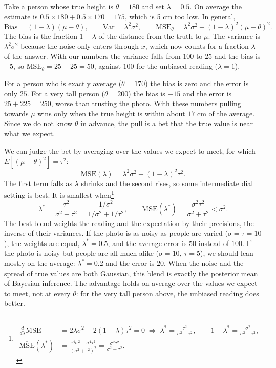 \documentclass{article}
\begin{document}
Take a person whose true height is $\theta = 180$ and set $\lambda = 0.5$. On average the estimate is $0.5\times 180 + 0.5\times 170 = 175$, which is 5 cm too low. In general,
\begin{equation*}
	\mathrm{Bias} = (1-\lambda)(\mu-\theta), \qquad
	\mathrm{Var} = \lambda^2\sigma^2, \qquad
	\mathrm{MSE}_\theta = \lambda^2\sigma^2 + (1-\lambda)^2(\mu-\theta)^2 .
\end{equation*}
The bias is the fraction $1-\lambda$ of the distance from the truth to $\mu$. The variance is $\lambda^2\sigma^2$ because the noise only enters through $x$, which now counts for a fraction $\lambda$ of the answer. With our numbers the variance falls from $100$ to $25$ and the bias is $-5$, so
$\mathrm{MSE}_\theta = 25 + 25 = 50$, against $100$ for the unbiased reading ($\lambda = 1$).

For a person who is exactly average ($\theta = 170$) the bias is zero and the error is only $25$. For a very tall person ($\theta = 200$) the bias is $-15$ and the error is $25 + 225 = 250$, worse than trusting the photo. With these numbers pulling towards $\mu$ wins only when the true height is within about $17$ cm of the average. Since we do not know $\theta$ in advance, the pull is a bet that the true value is near what we expect.

We can judge the bet by averaging over the values we expect to meet, for which $E[(\mu-\theta)^2]=\tau^2$:
\begin{equation*}
	\overline{\mathrm{MSE}}(\lambda) = \lambda^2\sigma^2 + (1-\lambda)^2\tau^2 .
\end{equation*}
The first term falls as $\lambda$ shrinks and the second rises, so some intermediate dial setting is best. It is smallest when\footnote{
	\begin{align*}
		\frac{d}{d\lambda}\overline{\mathrm{MSE}}
		&= 2\lambda\sigma^2 - 2(1-\lambda)\tau^2 = 0
		\;\Rightarrow\; \lambda^\ast = \frac{\tau^2}{\sigma^2+\tau^2},
		\qquad 1-\lambda^\ast = \frac{\sigma^2}{\sigma^2+\tau^2},\\[4pt]
		\overline{\mathrm{MSE}}(\lambda^\ast)
		&= \frac{\tau^4\sigma^2 + \sigma^4\tau^2}{(\sigma^2+\tau^2)^2}
		= \frac{\sigma^2\tau^2}{\sigma^2+\tau^2}.
	\end{align*}
}
\begin{equation*}
	\lambda^\ast = \frac{\tau^2}{\sigma^2+\tau^2} = \frac{1/\sigma^2}{1/\sigma^2 + 1/\tau^2},
	\qquad
	\overline{\mathrm{MSE}}(\lambda^\ast) = \frac{\sigma^2\tau^2}{\sigma^2+\tau^2} < \sigma^2 .
\end{equation*}
The best blend weights the reading and the expectation by their precisions, the inverse of their variances. If the photo is as noisy as people are varied ($\sigma = \tau = 10$), the weights are equal, $\lambda^\ast = 0.5$, and the average error is $50$ instead of $100$. If the photo is noisy but people are all much alike ($\sigma = 10$, $\tau = 5$), we should lean mostly on the average: $\lambda^\ast = 0.2$ and the error is $20$. When the noise and the spread of true values are both Gaussian, this blend is exactly the posterior mean of Bayesian inference. The advantage holds on average over the values we expect to meet, not at every $\theta$: for the very tall person above, the unbiased reading does better.
\end{document}
